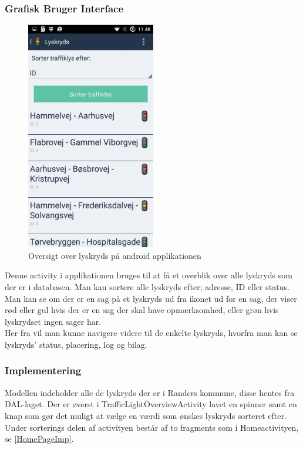 	\subsubsection{Grafisk Bruger Interface}	
	\begin{figure} [!ht]
		\begin{center}
			\includegraphics[height=10cm]{Android/Billeder/AndroidLyskryds}
		\end{center}
		\caption{Oversigt over lyskryds på android applikationen}
		\label{fig:Oversigt over lyskryds på android applikationen}
	\end{figure}
	
	\noindent Denne activity i applikationen bruges til at få et overblik over alle lyskryds som der er i databasen. Man kan sortere alle lyskryds efter; adresse, ID eller status. Man kan se om der er en sag på et lyskryds ud fra ikonet ud for en sag, der viser rød eller gul hvis der er en sag der skal have opmærksomhed, eller grøn hvis lyskrydset ingen sager har.\\
	Her fra vil man kunne navigere videre til de enkelte lyskryds, hvorfra man kan se lyskryds' status, placering, log og bilag.
	
	\subsubsection{Implementering}
	Modellen indeholder alle de lyskryds der er i Randers kommune, disse hentes fra DAL-laget.
	Der er øverst i TrafficLightOverviewActivity lavet en spinner samt en knap som gør det muligt at vælge en værdi som ønskes lyskryds sorteret efter.
	Under sorterings delen af activityen består af to fragments som i Homeactivityen, se \vref{HomePageImp}.
	
	
	\pagebreak